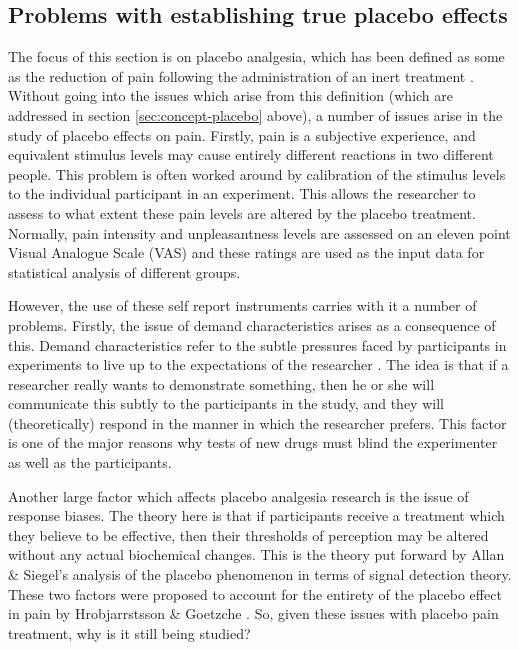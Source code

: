 \subsection{Problems with establishing true placebo effects}

The focus of this section is on placebo analgesia, which has been defined as some as the reduction of pain following the administration of an inert treatment \cite{Shapiro1997}. Without going into the issues which arise from this definition (which are addressed in section \ref{sec:concept-placebo} above), a number of issues arise in the study of placebo effects on pain. Firstly, pain is a subjective experience, and equivalent stimulus levels may cause entirely different reactions  in two different people\cite{Kirsch1997}. This problem is often worked around by calibration of the stimulus levels to the individual participant in an experiment. This allows the researcher to assess to what extent these pain levels are altered by the placebo treatment. Normally, pain intensity and unpleasantness levels are assessed on an eleven point Visual Analogue Scale (VAS) and these ratings are used as the input data for statistical analysis of different groups. 

However, the use of these self report instruments carries with it a number of problems. Firstly, the issue of demand characteristics  arises as a consequence of this. Demand characteristics refer to the subtle pressures faced by participants in experiments to live up to the expectations of the researcher \cite{weber1972subject}. The idea is that if a researcher really wants to demonstrate something, then he or she will communicate this subtly to the participants in the study, and they will (theoretically) respond in the manner in which the researcher prefers. This factor is one of the major reasons why tests of new drugs must blind the experimenter as well as the participants. 

Another large factor which affects placebo analgesia research is the issue of response biases. The theory here is that if participants receive a treatment which they believe to be effective, then their thresholds of perception may be altered without any actual biochemical changes. This is the theory put forward by Allan \& Siegel's \cite{Allan2002} analysis of the placebo phenomenon in terms of signal detection theory. These two factors were proposed to account for the entirety of the placebo effect in pain by Hrobjarrstsson \& Goetzche \cite{hrobjartsson2001placebo}. So, given these issues with placebo pain treatment, why is it still being studied? 

